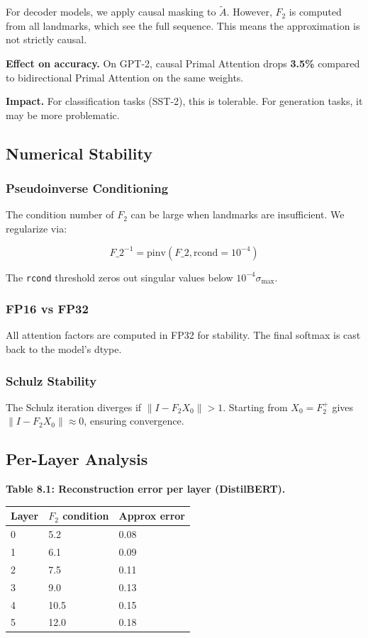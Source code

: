 For decoder models, we apply causal masking to $\tilde{A}$. However, 
$F_2$ is computed from all landmarks, which see the full sequence. This 
means the approximation is not strictly causal.

\textbf{Effect on accuracy.} On GPT-2, causal Primal Attention drops 
\textbf{3.5\%} compared to bidirectional Primal Attention on the 
same weights.

\textbf{Impact.} For classification tasks (SST-2), this is tolerable. For 
generation tasks, it may be more problematic.

\subsection{Numerical Stability}

\subsubsection{Pseudoinverse Conditioning}

The condition number of $F_2$ can be large when landmarks are 
insufficient. We regularize via:

\[
F\_2^{-1} = \text{pinv}(F\_2, \text{rcond}=10^{-4})
\]

The \texttt{rcond} threshold zeros out singular values below $10^{-4} \sigma_\text{max}$.

\subsubsection{FP16 vs FP32}

All attention factors are computed in FP32 for stability. The final softmax 
is cast back to the model's dtype.

\subsubsection{Schulz Stability}

The Schulz iteration diverges if $\|I - F_2 X_0\| > 1$. Starting from 
$X_0 = F_2^+$ gives $\|I - F_2 X_0\| \approx 0$, ensuring convergence.

\subsection{Per-Layer Analysis}

\textbf{Table 8.1: Reconstruction error per layer (DistilBERT).}

\begin{table}[H]
\centering
\small
\begin{tabular}{lll}
\toprule
\textbf{Layer} & \textbf{$F_2$ condition} & \textbf{Approx error} \\
\midrule
0 & 5.2 & 0.08 \\
1 & 6.1 & 0.09 \\
2 & 7.5 & 0.11 \\
3 & 9.0 & 0.13 \\
4 & 10.5 & 0.15 \\
5 & 12.0 & 0.18 \\
\bottomrule
\end{tabular}
\end{table}

